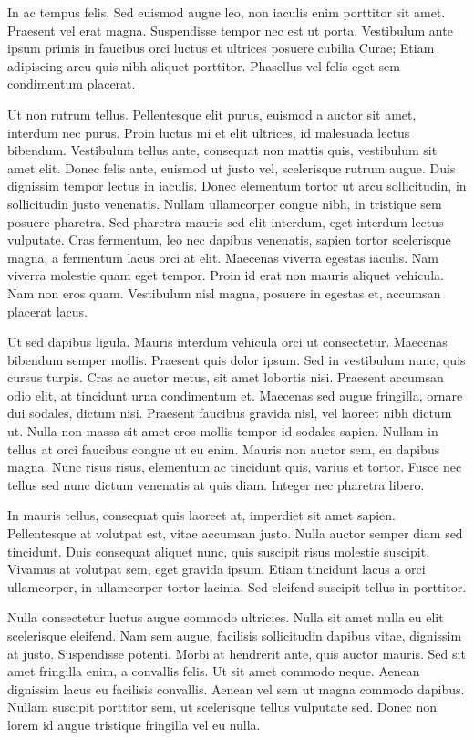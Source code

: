 In ac tempus felis. Sed euismod augue leo, non iaculis enim porttitor
sit amet. Praesent vel erat magna. Suspendisse tempor nec est ut
porta. Vestibulum ante ipsum primis in faucibus orci luctus et
ultrices posuere cubilia Curae; Etiam adipiscing arcu quis nibh
aliquet porttitor. Phasellus vel felis eget sem condimentum placerat.

Ut non rutrum tellus. Pellentesque elit purus, euismod a auctor sit
amet, interdum nec purus. Proin luctus mi et elit ultrices, id
malesuada lectus bibendum. Vestibulum tellus ante, consequat non
mattis quis, vestibulum sit amet elit. Donec felis ante, euismod ut
justo vel, scelerisque rutrum augue. Duis dignissim tempor lectus in
iaculis. Donec elementum tortor ut arcu sollicitudin, in sollicitudin
justo venenatis. Nullam ullamcorper congue nibh, in tristique sem
posuere pharetra. Sed pharetra mauris sed elit interdum, eget interdum
lectus vulputate. Cras fermentum, leo nec dapibus venenatis, sapien
tortor scelerisque magna, a fermentum lacus orci at elit. Maecenas
viverra egestas iaculis. Nam viverra molestie quam eget tempor. Proin
id erat non mauris aliquet vehicula. Nam non eros quam. Vestibulum
nisl magna, posuere in egestas et, accumsan placerat lacus.

Ut sed dapibus ligula. Mauris interdum vehicula orci ut
consectetur. Maecenas bibendum semper mollis. Praesent quis dolor
ipsum. Sed in vestibulum nunc, quis cursus turpis. Cras ac auctor
metus, sit amet lobortis nisi. Praesent accumsan odio elit, at
tincidunt urna condimentum et. Maecenas sed augue fringilla, ornare
dui sodales, dictum nisi. Praesent faucibus gravida nisl, vel laoreet
nibh dictum ut. Nulla non massa sit amet eros mollis tempor id sodales
sapien. Nullam in tellus at orci faucibus congue ut eu enim. Mauris
non auctor sem, eu dapibus magna. Nunc risus risus, elementum ac
tincidunt quis, varius et tortor. Fusce nec tellus sed nunc dictum
venenatis at quis diam. Integer nec pharetra libero.

In mauris tellus, consequat quis laoreet at, imperdiet sit amet
sapien. Pellentesque at volutpat est, vitae accumsan justo. Nulla
auctor semper diam sed tincidunt. Duis consequat aliquet nunc, quis
suscipit risus molestie suscipit. Vivamus at volutpat sem, eget
gravida ipsum. Etiam tincidunt lacus a orci ullamcorper, in
ullamcorper tortor lacinia. Sed eleifend suscipit tellus in porttitor.

Nulla consectetur luctus augue commodo ultricies. Nulla sit amet nulla
eu elit scelerisque eleifend. Nam sem augue, facilisis sollicitudin
dapibus vitae, dignissim at justo. Suspendisse potenti. Morbi at
hendrerit ante, quis auctor mauris. Sed sit amet fringilla enim, a
convallis felis. Ut sit amet commodo neque. Aenean dignissim lacus eu
facilisis convallis. Aenean vel sem ut magna commodo dapibus. Nullam
suscipit porttitor sem, ut scelerisque tellus vulputate sed. Donec non
lorem id augue tristique fringilla vel eu nulla.

